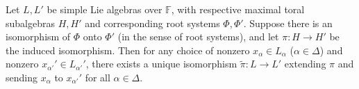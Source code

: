 Let $L, L'$ be simple Lie algebras over $\mathbb{F}$, with respective maximal toral subalgebras $H, H'$ and corresponding root systems $\Phi, \Phi'$. Suppose there is an isomorphism of $\Phi$ onto $\Phi'$ (in the sense of root systems), and let $\pi: H \to H'$ be the induced isomorphism. Then for any choice of nonzero $x_\alpha \in L_\alpha$ ($\alpha \in \Delta$) and nonzero $x_{\alpha'}' \in L_{\alpha'}'$, there exists a unique isomorphism $\tilde{\pi}: L \to L'$ extending $\pi$ and sending $x_\alpha$ to $x_{\alpha'}'$ for all $\alpha \in \Delta$.

